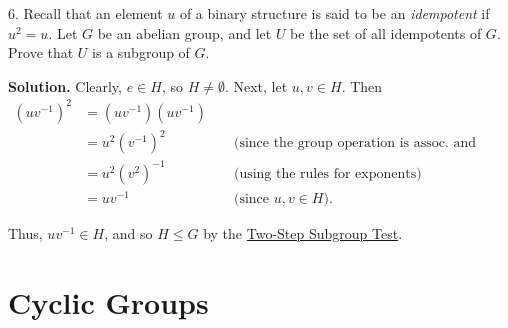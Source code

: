 \documentclass[10pt,]{book}
\theoremstyle{plain}
\theoremstyle{definition}
\theoremstyle{definition}
\theoremstyle{definition}
\theoremstyle{definition}
\numberwithin{equation}{section}
\newcommand{\amp}{&}
\begin{document}
\begin{exerciselist}
\item[6.]\hypertarget{exercise-33}{}Recall that an element \(u\) of a binary structure is said to be an \emph{idempotent} if \(u^2=u\). Let \(G\) be an abelian group, and let \(U\) be the set of all idempotents of \(G\). Prove that \(U\) is a subgroup of \(G\).%
\par\smallskip
\par\smallskip
\noindent\textbf{Solution.}\hypertarget{solution-33}{}\quad
Clearly, \(e\in H\), so \(H\neq \emptyset\). Next, let \(u,v\in H\). Then%
\begin{align*}
(uv^{-1})^2\amp =(uv^{-1})(uv^{-1})\amp \amp\\
\amp =u^2(v^{-1})^2 \amp \amp \text{ (since the group operation is assoc. and comm.) }\\
\amp =u^2(v^2)^{-1} \amp \amp \text{ (using the rules for exponents) }\\
\amp =uv^{-1}\amp \amp \text{ (since \(u,v\in H\)). }
\end{align*}
%
\par
Thus, \(uv^{-1}\in H\), and so \(H \leq G\) by the \hyperref[twostep]{Two-Step Subgroup Test}.%
\end{exerciselist}
\typeout{************************************************}
\typeout{************************************************}
\chapter[{Cyclic Groups}]{Cyclic Groups}\label{cyc}
\typeout{************************************************}
\typeout{************************************************}
\end{document}
